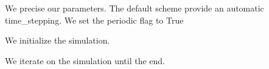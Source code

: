 \documentclass[letterpaper,10pt,english]{sphinxmanual}
\begin{document}
\noindent{}

We precise our parameters. The default scheme provide an automatic
time\_stepping. We set the periodic flag to True

\begin{sphinxVerbatim}[commandchars=\\\{\}]
    
\end{sphinxVerbatim}

We initialize the simulation.

\begin{sphinxVerbatim}[commandchars=\\\{\}]
  
     
                          
\end{sphinxVerbatim}

We iterate on the simulation until the end.
\end{document}
